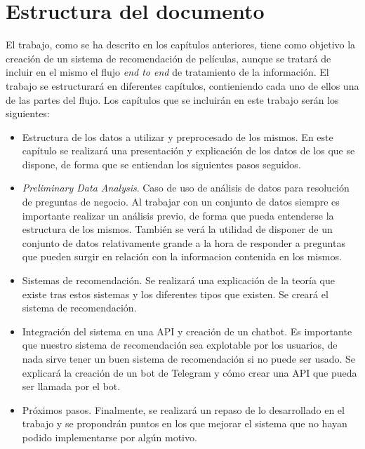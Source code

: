 \section{Estructura del documento}\label{sec:estructura}

El trabajo, como se ha descrito en los capítulos anteriores, tiene como objetivo la creación de un sistema de recomendación de películas, aunque se tratará de incluir en el mismo el flujo \textit{end to end} de tratamiento de la información. El trabajo se estructurará en diferentes capítulos, contieniendo cada uno de ellos una de las partes del flujo. Los capítulos que se incluirán en este trabajo serán los siguientes:

\begin{itemize}
    \item Estructura de los datos a utilizar y preprocesado de los mismos. En este capítulo se realizará una presentación y explicación de los datos de los que se dispone, de forma que se entiendan los siguientes pasos seguidos.
    \item \textit{Preliminary Data Analysis}. Caso de uso de análisis de datos para resolución de preguntas de negocio. Al trabajar con un conjunto de datos siempre es importante realizar un análisis previo, de forma que pueda entenderse la estructura de los mismos. También se verá la utilidad de disponer de un conjunto de datos relativamente grande a la hora de responder a preguntas que pueden surgir en relación con la informacion contenida en los mismos.
    \item Sistemas de recomendación. Se realizará una explicación de la teoría que existe tras estos sistemas y los diferentes tipos que existen. Se creará el sistema de recomendación.
    \item Integración del sistema en una API y creación de un chatbot. Es importante que nuestro sistema de recomendación sea explotable por los usuarios, de nada sirve tener un buen sistema de recomendación si no puede ser usado. Se explicará la creación de un bot de Telegram y cómo crear una API que pueda ser llamada por el bot.
    \item Próximos pasos. Finalmente, se realizará un repaso de lo desarrollado en el trabajo y se propondrán puntos en los que mejorar el sistema que no hayan podido implementarse por algún motivo.
\end{itemize}

    
